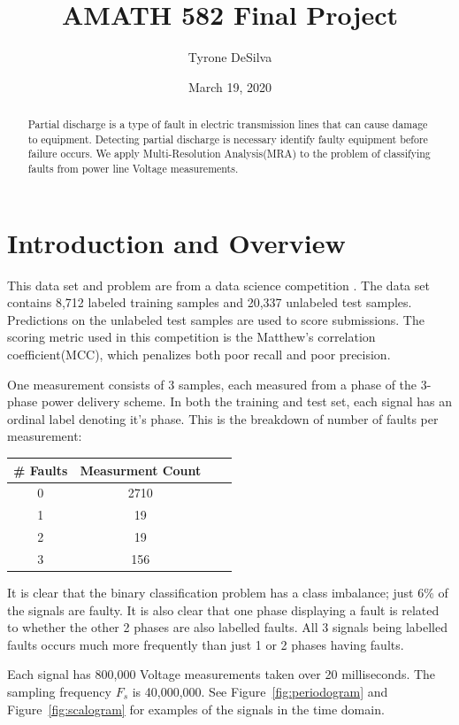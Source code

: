 \documentclass{article}
\title{AMATH 582 Final Project}
\author{Tyrone DeSilva}
\date{March 19, 2020}
\begin{document}
\maketitle

\begin{abstract}
    Partial discharge is a type of fault in electric transmission lines that can
    cause damage to equipment. Detecting partial discharge is necessary identify faulty
    equipment before failure occurs. We apply Multi-Resolution Analysis(MRA) to
    the problem of classifying faults from power line Voltage measurements.
\end{abstract}

\section{Introduction and Overview}
This data set and problem are from a data science competition \cite{vsb_data}.
The data set contains 8,712 labeled training samples and 20,337 unlabeled test
samples. Predictions on the unlabeled test samples are used to score
submissions. The scoring metric used in this competition is the Matthew's
correlation coefficient(MCC), which penalizes both poor recall and poor precision.

One measurement consists of 3 samples, each measured from a phase of the
3-phase power delivery scheme. In both the training and test set, each signal
has an ordinal label denoting it's phase. This is the breakdown of number of faults per measurement:
\begin{center}
\begin{tabular}{ |c|c|c|c| } 
\hline
\# Faults & Measurment Count \\
\hline
0 & 2710 \\ 
1 & 19 \\
2 & 19 \\
3 & 156 \\
\hline
\end{tabular}
\end{center}

It is clear that the binary classification problem has a class
imbalance; just 6\% of the signals are faulty.
It is also clear that one phase displaying a fault is related
to whether the other 2 phases are also labelled faults. All 3 signals being
labelled faults occurs much more frequently than just 1 or 2 phases having faults.

Each signal has 800,000 Voltage measurements taken over 20 milliseconds. The
sampling frequency $F_s$ is 40,000,000. See Figure~\ref{fig:periodogram} and
Figure~\ref{fig:scalogram} for examples of the signals in the time domain.
\end{document}
